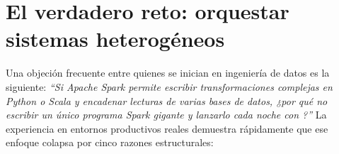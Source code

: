\section{El verdadero reto: orquestar sistemas heterogéneos}\label{sec:sistemas-heterogeneos}

Una objeción frecuente entre quienes se inician en ingeniería de datos es la siguiente: \textit{``Si Apache Spark permite escribir transformaciones complejas en Python o Scala y encadenar lecturas de varias bases de datos, ¿por qué no escribir un único programa Spark gigante y lanzarlo cada noche con ?''} La experiencia en entornos productivos reales demuestra rápidamente que ese enfoque colapsa por cinco razones estructurales:

